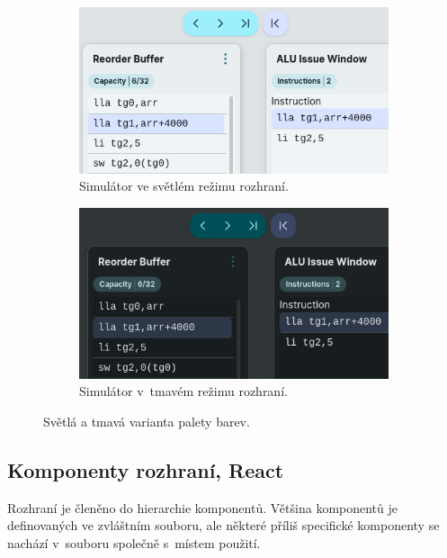 \begin{figure}
     \centering
     \begin{subfigure}[b]{0.49\textwidth}
         \centering
         \includegraphics[width=\textwidth]{obrazky-figures/impl/lightmode.png}
         \caption{Simulátor ve světlém režimu rozhraní.}
         \label{fig:lightmode}
     \end{subfigure}
     \hfill
     \begin{subfigure}[b]{0.49\textwidth}
         \centering
         \includegraphics[width=\textwidth]{obrazky-figures/impl/darkmode.png}
         \caption{Simulátor v~tmavém režimu rozhraní.}
         \label{fig:darkmode}
     \end{subfigure}
        \caption{Světlá a tmavá varianta palety barev.}
        \label{lightanddarkmode}
\end{figure}

\subsection{Komponenty rozhraní, React}

Rozhraní je členěno do hierarchie komponentů.
Většina komponentů je definovaných ve zvláštním souboru, ale některé příliš specifické komponenty se nachází v~souboru společně s~místem použití.


